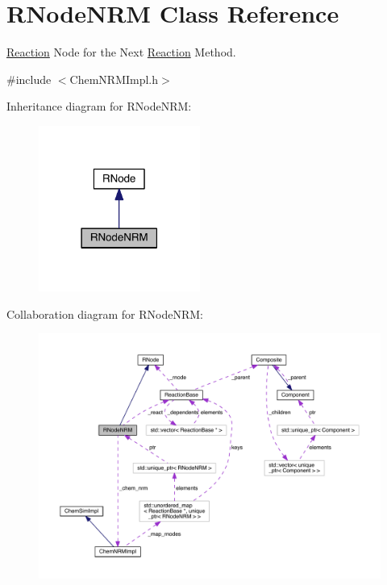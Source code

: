 \hypertarget{classRNodeNRM}{\section{R\+Node\+N\+R\+M Class Reference}
\label{classRNodeNRM}
}


\hyperlink{classReaction}{Reaction} Node for the Next \hyperlink{classReaction}{Reaction} Method.  




{\ttfamily \#include $<$Chem\+N\+R\+M\+Impl.\+h$>$}



Inheritance diagram for R\+Node\+N\+R\+M\+:\nopagebreak
\begin{figure}[H]
\begin{center}
\leavevmode
\includegraphics[width=150pt]{classRNodeNRM__inherit__graph}
\end{center}
\end{figure}


Collaboration diagram for R\+Node\+N\+R\+M\+:\nopagebreak
\begin{figure}[H]
\begin{center}
\leavevmode
\includegraphics[width=350pt]{classRNodeNRM__coll__graph}
\end{center}
\end{figure}
